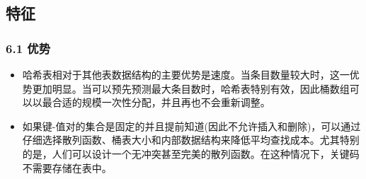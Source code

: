 \subsection{特征}
\subsubsection{6.1 优势}
\begin{itemize}
\item 哈希表相对于其他表数据结构的主要优势是速度。当条目数量较大时，这一优势更加明显。当可以预先预测最大条目数时，哈希表特别有效，因此桶数组可以以最合适的规模一次性分配，并且再也不会重新调整。
\item 如果键-值对的集合是固定的并且提前知道(因此不允许插入和删除)，可以通过仔细选择散列函数、桶表大小和内部数据结构来降低平均查找成本。尤其特别的是，人们可以设计一个无冲突甚至完美的散列函数。在这种情况下，关键码不需要存储在表中。
\end{itemize}
